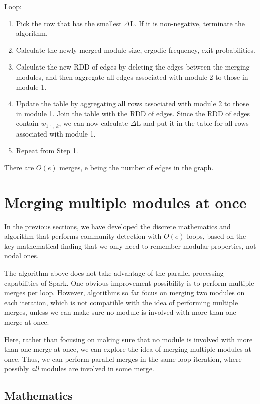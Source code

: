 \documentclass[12pt,a4paper]{article}
\begin{document}
Loop:
\begin{enumerate}
    \item Pick the row that has the smallest \(\Delta\)L. If it is non-negative, terminate the algorithm.
    \item Calculate the newly merged module size, ergodic frequency, exit probabilities.
    \item Calculate the new RDD of edges by deleting the edges between the merging modules, and then aggregate all edges associated with module 2 to those in module 1.
    \item Update the table by aggregating all rows associated with module 2 to those in module 1. Join the table with the RDD of edges. Since the RDD of edges contain \(w_{1\leftrightharpoons k}\), we can now calculate \(\Delta\)L and put it in the table for all rows associated with module 1.
    \item Repeat from Step 1.
\end{enumerate}

There are \(O(e)\) merges, e being the number of edges in the graph.

\section{Merging multiple modules at once}

In the previous sections, we have developed the discrete mathematics and algorithm that performs community detection with \(O(e)\) loops, based on the key mathematical finding that we only need to remember modular properties, not nodal ones.

The algorithm above does not take advantage of the parallel processing capabilities of Spark. One obvious improvement possibility is to perform multiple merges per loop. However, algorithms so far focus on merging two modules on each iteration, which is not compatible with the idea of performing multiple merges, unless we can make sure no module is involved with more than one merge at once.

Here, rather than focusing on making sure that no module is involved with more than one merge at once, we can explore the idea of merging multiple modules at once. Thus, we can perform parallel merges in the same loop iteration, where possibly \emph{all} modules are involved in some merge.

\subsection{Mathematics}
\end{document}
